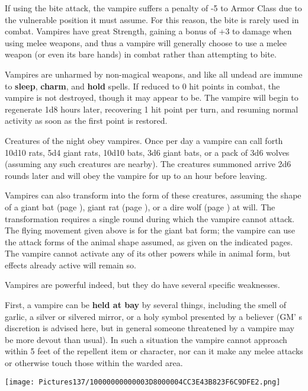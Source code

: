 \documentclass[a4paper,twoside,openany,10pt]{book}
\begin{document}
\begin{multicols}{2}
If using the bite attack, the vampire suffers a penalty of -5 to Armor Class due to the vulnerable position it must assume. For this reason, the bite is rarely used in combat. Vampires have great Strength, gaining a bonus of +3 to damage when using melee weapons, and thus a vampire will generally choose to use a melee weapon (or even its bare hands) in combat rather than attempting to bite.

Vampires are unharmed by non-magical weapons, and like all undead are immune to \textbf{sleep}, \textbf{charm},\textbf{ }and \textbf{hold }spells. If reduced to 0 hit points in combat, the vampire is not destroyed, though it may appear to be. The vampire will begin to regenerate 1d8 hours later, recovering 1 hit point per turn, and resuming normal activity as soon as the first point is restored.

Creatures of the night obey vampires. Once per day a vampire can call forth 10d10 rats, 5d4 giant rats, 10d10 bats, 3d6 giant bats, or a pack of 3d6 wolves (assuming any such creatures are nearby). The creatures summoned arrive 2d6 rounds later and will obey the vampire for up to an hour before leaving. 

Vampires can also transform into the form of these creatures, assuming the shape of a giant bat (page \hyperlink{bat-and-bat-giant}{\pageref{bat-and-bat-giant}}), giant rat (page \hyperlink{rat-and-rat-giant}{\pageref{rat-and-rat-giant}}), or a dire wolf (page \hyperlink{wolf-and-wolf-dire}{\pageref{wolf-and-wolf-dire}}) at will. The transformation requires a single round during which the vampire cannot attack. The flying movement given above is for the giant bat form; the vampire can use the attack forms of the animal shape assumed, as given on the indicated pages. The vampire cannot activate any of its other powers while in animal form, but effects already active will remain so. 

Vampires are powerful indeed, but they do have several specific weaknesses.

First, a vampire can be \textbf{held at bay} by several things, including the smell of garlic, a silver or silvered mirror, or a holy symbol presented by a believer (GM' s discretion is advised here, but in general someone threatened by a vampire may be more devout than usual). In such a situation the vampire cannot approach within 5 feet of the repellent item or character, nor can it make any melee attacks or otherwise touch those within the warded area. 

\begin{center} \texttt{[image: Pictures137/10000000000003D8000004CC3E43B823F6C9DFE2.png]} \end{center}


\end{multicols}
\end{document}
